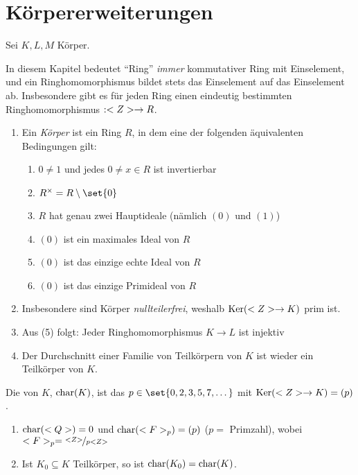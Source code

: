 \section{Körpererweiterungen}

Sei $K,L,M$ Körper.

\begin{remark}
	In diesem Kapitel bedeutet ``Ring'' \emph{immer} kommutativer Ring mit Einselement, und ein Ringhomomorphismus bildet stets das Einselement auf das Einselement ab.
	Insbesondere gibt es für jeden Ring einen eindeutig bestimmten Ringhomomorphismus $: <Z> \to R$.
\end{remark}

\begin{remark}
	\begin{enumerate}[label=(\alph*)]
		\item Ein \emph{Körper} ist ein Ring $R$, in dem eine der folgenden äquivalenten Bedingungen gilt:
		\begin{enumerate}[label=\arabic*)]
			\item $0 \neq 1$ und jedes $0 \neq x \in R$ ist invertierbar
			\item $R^{\times} = R \setminus \set{0}$
			\item $R$ hat genau zwei Hauptideale (nämlich $(0)$ und $(1)$)
			\item $(0)$ ist ein maximales Ideal von $R$
			\item $(0)$ ist das einzige echte Ideal von $R$
			\item $(0)$ ist das einzige Primideal von $R$
		\end{enumerate}
		\item Insbesondere sind Körper \emph{nullteilerfrei}, weshalb $\operatorname{Ker}(<Z> \to K)$ prim ist.
		\item Aus (5) folgt: Jeder Ringhomomorphismus $K \to L$ ist injektiv %
		\item Der Durchschnitt einer Familie von Teilkörpern von $K$ ist wieder ein Teilkörper von $K$.
	\end{enumerate}
\end{remark}

\begin{definition}[Charakteristik]
	Die  von $K$, $\operatorname{char}(K)$, ist das $p \in \set{0,2,3,5,7, \dots}$ mit $\operatorname{Ker}(<Z> \to K) = (p)$.
\end{definition}

\begin{example}
	\begin{enumerate}[label=(\alph*)]
		\item $\operatorname{char}(<Q>) = 0$ und $\operatorname{char}(<F>_p) = (p)$ ($p =$ Primzahl), wobei $\Fp = \lnkset{\Z}{p\Z}$
		\item Ist $K_0 \subseteq K$ Teilkörper, so ist $\operatorname{char}(K_0) = \operatorname{char}(K)$.
	\end{enumerate}
\end{example}

